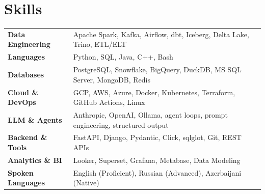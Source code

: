 \documentclass[letterpaper,10pt]{article}
\begin{document}
\section{Skills}
\renewcommand{\arraystretch}{1.4}
\begin{tabularx}{\textwidth}{@{}>{\bfseries\color{accent}}l X@{}}
    Data Engineering    & Apache Spark, Kafka, Airflow, dbt, Iceberg, Delta Lake, Trino, ETL/ELT \\
    Languages           & Python, SQL, Java, C++, Bash \\
    Databases           & PostgreSQL, Snowflake, BigQuery, DuckDB, MS SQL Server, MongoDB, Redis \\
    Cloud \& DevOps     & GCP, AWS, Azure, Docker, Kubernetes, Terraform, GitHub Actions, Linux \\
    LLM \& Agents       & Anthropic, OpenAI, Ollama, agent loops, prompt engineering, structured output \\
    Backend \& Tools    & FastAPI, Django, Pydantic, Click, sqlglot, Git, REST APIs \\
    Analytics \& BI     & Looker, Superset, Grafana, Metabase, Data Modeling \\
    Spoken Languages    & English (Proficient), Russian (Advanced), Azerbaijani (Native) \\
\end{tabularx}
\end{document}
